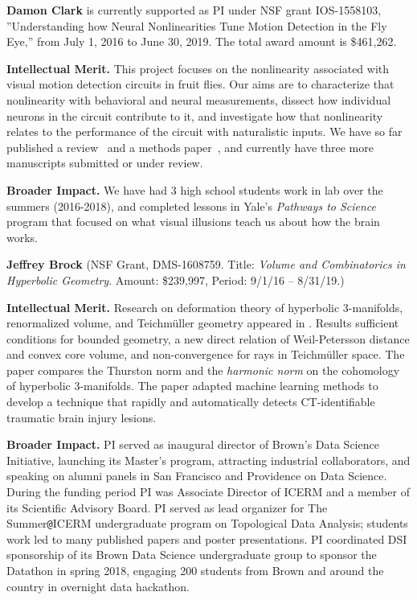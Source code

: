 \vskip10pt \textbf{Damon Clark} is currently supported as PI under NSF
grant IOS-1558103, ''Understanding how Neural Nonlinearities Tune
Motion Detection in the Fly Eye,'' from July 1, 2016 to June 30, 2019.
The total award amount is \$461,262.

{\bf Intellectual Merit.} This project focuses on the nonlinearity
associated with visual motion detection circuits in fruit flies. Our
aims are to characterize that nonlinearity with behavioral and neural
measurements, dissect how individual neurons in the circuit contribute
to it, and investigate how that nonlinearity relates to the
performance of the circuit with naturalistic inputs. We have so far
published a review~\citep{clark:16} and a methods
paper~\citep{mano:17}, and currently have three more manuscripts
submitted or under review.

{\bf Broader Impact.} We have had 3 high school students work in lab
over the summers (2016-2018), and completed lessons in Yale's
\textit{Pathways to Science} program that focused on what visual
illusions teach us about how the brain works.

\vskip10pt \textbf{Jeffrey Brock} (NSF Grant, DMS-1608759. Title: {\em Volume and Combinatorics in Hyperbolic Geometry}. Amount: \$239,997, Period: 9/1/16 --
8/31/19.) 

\textbf{Intellectual Merit.} 
Research on deformation theory of hyperbolic 3-manifolds, renormalized volume, and Teichm\"uller geometry appeared in \citep{BMNS:bounded:models,Brock:Bromberg:vol,Brock:Bromberg:cone:inflex,BLMR:wp:limit,BLMR:teichmuller}. Results sufficient conditions for bounded geometry, a new direct relation of Weil-Petersson distance and convex core volume, and non-convergence for rays in Teichm\"uller space.
The paper \citep{Brock:Dunfield:norms} compares the Thurston norm and the {\em harmonic norm} on the cohomology of   hyperbolic 3-manifolds. The paper \citep{Keshavamurthy:TBI} adapted machine learning methods to develop a technique that rapidly and automatically detects CT-identifiable traumatic brain injury lesions.

\textbf{Broader Impact.} PI served as inaugural director of Brown's Data Science Initiative, launching its Master's program, attracting industrial collaborators, and speaking on alumni panels in San Francisco and Providence on Data Science. During the funding period PI was Associate Director of ICERM and a member of its Scientific Advisory Board. PI served as lead organizer for The Summer\verb+@+ICERM undergraduate program on Topological Data Analysis; students work led to many published papers and poster presentations.
PI coordinated DSI sponsorship of its Brown Data Science undergraduate group to sponsor the Datathon in spring 2018, engaging 200 students from Brown and around the country in overnight data hackathon. 